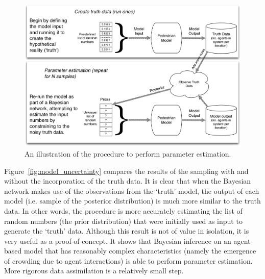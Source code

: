 \documentclass[runningheads]{llncs}
\begin{document}
\begin{figure}%
\centering
\includegraphics[width=\textwidth]{figures/procedure_diagram}
\caption{An illustration of the procedure to perform parameter estimation.} 
\label{fig:procedure_diagram}
\end{figure}





Figure~\ref{fig:model_uncertainty} compares the results of the sampling with and without the incorporation of the truth data. It is clear that when the Bayesian network makes use of the observations from the `truth' model, the output of each model (i.e. sample of the posterior distribution) is much more similar to the truth data. In other words, the procedure is more accurately estimating the list of random numbers (the prior distribution) that were initially used as input to generate the `truth' data. Although this result is not of value in isolation, it is very useful as a proof-of-concept. It shows that Bayesian inference on an agent-based model that has reasonably complex characteristics (namely the emergence of crowding due to agent interactions) is able to perform parameter estimation. More rigorous data assimilation is a relatively small step.
\end{document}
